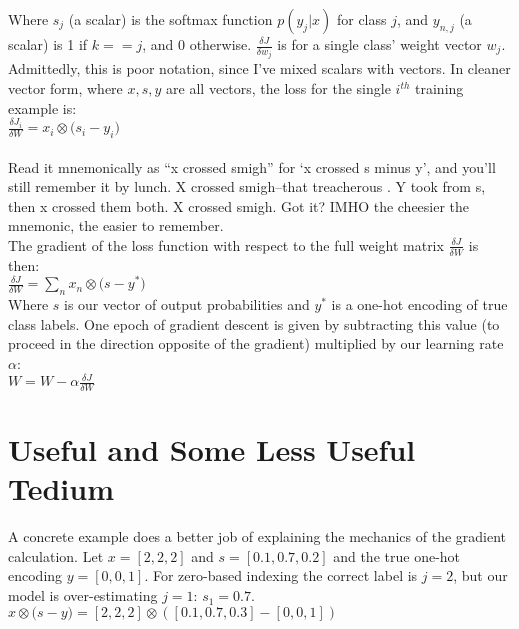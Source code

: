\documentclass{article}
\begin{document}
Where $s_{j}$ (a scalar) is the softmax function $p(y_{j}|x)$ for class $j$, and $y_{n,j}$ (a scalar) is 1 if $k == j$, and 0 otherwise. $\frac{\delta J}{\delta w_{j}}$ is for a single class' weight vector $w_{j}$. Admittedly, this is poor notation, since I've mixed scalars with vectors. In cleaner vector form, where $x, s, y$ are all vectors, the loss for the single $i^{th}$ training example is: \\

$\frac{\delta J_{i}}{\delta W} = x_{i} \otimes \big(s_{i} - y_{i}\big) $ \\ \\

Read it mnemonically as ``x crossed smigh'' for `x crossed s minus y', and you'll still remember it by lunch. X crossed smigh--that treacherous . Y took from s, then x crossed them both. X crossed smigh. Got it? IMHO the cheesier the mnemonic, the easier to remember. \\

The gradient of the loss function with respect to the full weight matrix $\frac{\delta J}{\delta W}$ is then: \\

$\boxed{ \frac{\delta J}{\delta W} = \sum_{n} x_{n} \otimes \big(s - y^{*}\big) }$ \\

Where $s$ is our vector of output probabilities and $y^{*}$ is a one-hot encoding of true class labels. One epoch of gradient descent is given by subtracting this value (to proceed in the direction opposite of the gradient) multiplied by our learning rate $\alpha$: \\

$ W = W - \alpha \frac{\delta J}{\delta W}$

\section{Useful and Some Less Useful Tedium}

A concrete example does a better job of explaining the mechanics of the gradient calculation. Let $x = [2,2,2]$ and $s = [0.1, 0.7, 0.2]$ and the true one-hot encoding $y = [0,0,1]$. For zero-based indexing the correct label is $j=2$, but our model is over-estimating $j=1$: $s_{1} = 0.7$. \\

$x \otimes \big(s - y\big) = [2,2,2] \otimes ([0.1, 0.7, 0.3] - [0, 0, 1])$ \\ \\
\end{document}
